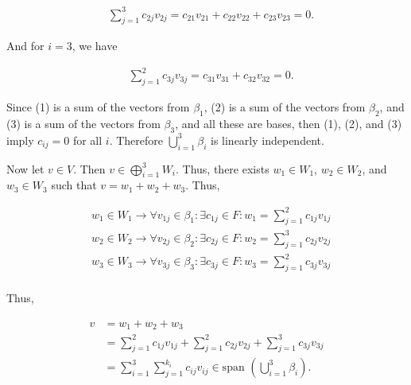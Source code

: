 \documentclass[12pt, a4paper]{article}
\begin{document}
\begin{equation}
    \begin{split}
        &\sum\limits_{j=1}^3c_{2j}v_{2j} = c_{21}v_{21}+c_{22}v_{22}+c_{23}v_{23}=0.
    \end{split}
\end{equation}

\vspace{2mm}

\noindent And for $i=3$, we have

\begin{equation}
    \begin{split}
        &\sum\limits_{j=1}^2c_{3j}v_{3j} = c_{31}v_{31}+c_{32}v_{32} = 0.
    \end{split}
\end{equation}

\vspace{4mm}

\noindent Since (1) is a sum of the vectors from $\beta_1$, (2) is a sum of the vectors from $\beta_2$, and (3) is a sum of the vectors from $\beta_3$, and all these are bases, then (1), (2), and (3) imply $c_{ij}=0$ for all $i$. Therefore $\bigcup_{i=1}^3\beta_i$ is linearly independent. 

\newpage Now let $v\in V$. Then $v\in\bigoplus_{i=1}^3 W_i$. Thus, there exists $w_1\in W_1$, $w_2\in W_2$, and $w_3\in W_3$ such that $v=w_1+w_2+w_3$. Thus,

\begin{equation*}
    \begin{split}
        &w_1\in W_1\rightarrow\forall v_{1j}\in\beta_1\colon\exists c_{1j}\in F\colon w_1=\sum\limits_{j=1}^2 c_{1j}v_{1j} \\
        &w_2\in W_2\rightarrow\forall v_{2j}\in\beta_2\colon\exists c_{2j}\in F\colon w_2=\sum\limits_{j=1}^3 c_{2j}v_{2j} \\
        &w_3\in W_3\rightarrow\forall v_{3j}\in\beta_3\colon\exists c_{3j}\in F\colon w_3=\sum\limits_{j=1}^2 c_{3j}v_{3j} \\
    \end{split}
\end{equation*}

\vspace{2mm}

\noindent Thus,

\begin{equation*}
    \begin{split}
        v &= w_1+w_2+w_3 \\
        &= \sum_{j=1}^2 c_{1j}v_{1j}+\sum_{j=1}^2 c_{2j}v_{2j}+\sum_{j=1}^3 c_{3j}v_{3j} \\
        &= \sum_{i=1}^3\sum_{j=1}^{k_i}c_{ij}v_{ij}\in\text{span }(\bigcup_{i=1}^3\beta_i).
    \end{split}
\end{equation*}
\end{document}
